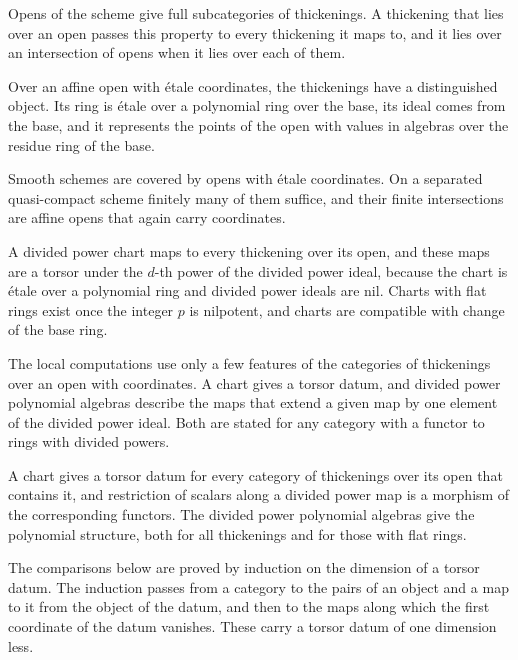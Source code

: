 Opens of the scheme give full subcategories of thickenings. A thickening that lies over an open passes this property to
every thickening it maps to, and it lies over an intersection of opens when it lies over each of them.

Over an affine open with \'etale coordinates, the thickenings have a distinguished object. Its ring is \'etale over a
polynomial ring over the base, its ideal comes from the base, and it represents the points of the open with values in
algebras over the residue ring of the base.

Smooth schemes are covered by opens with \'etale coordinates. On a separated quasi-compact scheme finitely many of them
suffice, and their finite intersections are affine opens that again carry coordinates.

A divided power chart maps to every thickening over its open, and these maps are a torsor under the $d$-th power of the
divided power ideal, because the chart is \'etale over a polynomial ring and divided power ideals are nil. Charts with
flat rings exist once the integer $p$ is nilpotent, and charts are compatible with change of the base ring.

The local computations use only a few features of the categories of thickenings over an open with coordinates. A chart
gives a torsor datum, and divided power polynomial algebras describe the maps that extend a given map by one element of
the divided power ideal. Both are stated for any category with a functor to rings with divided powers.

A chart gives a torsor datum for every category of thickenings over its open that contains it, and restriction of scalars
along a divided power map is a morphism of the corresponding functors. The divided power polynomial algebras give the
polynomial structure, both for all thickenings and for those with flat rings.

The comparisons below are proved by induction on the dimension of a torsor datum. The induction passes from a category
to the pairs of an object and a map to it from the object of the datum, and then to the maps along which the first
coordinate of the datum vanishes. These carry a torsor datum of one dimension less.

